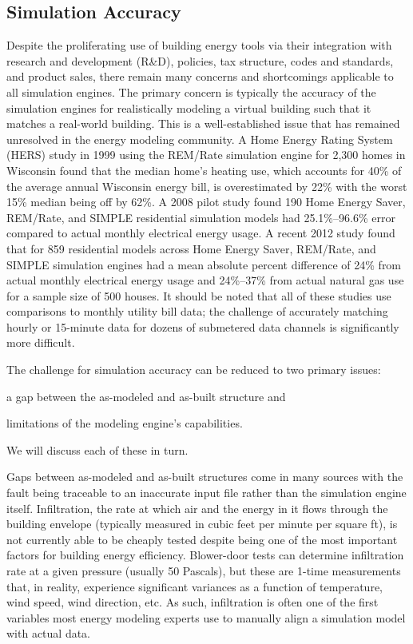 \documentclass[preprint, review, 12pt]{elsarticle}
\begin{document}
\subsection{Simulation Accuracy}
Despite the proliferating use of building energy tools via their integration with research and development (R\&D), policies, tax structure, codes and standards, and product sales, there remain many concerns and shortcomings applicable to all simulation engines. The primary concern is typically the accuracy of the simulation engines for realistically modeling a virtual building such that it matches a real-world building. This is a well-established issue that has remained unresolved in the energy modeling community. A Home Energy Rating System (HERS) study in 1999 \cite{cit:pigg2001} using the REM/Rate
simulation engine for 2,300 homes in Wisconsin found that the median home's heating use, which accounts for 40\% of the average annual Wisconsin energy bill, is overestimated by 22\% with the worst 15\% median being off by 62\%. A 2008 pilot study \cite{cit:earthadvantage2009} found 190 Home Energy Saver, REM/Rate, and SIMPLE residential simulation models had 25.1\%--96.6\% error compared to actual monthly electrical energy usage. A recent 2012 study \cite{cit:roberts2012} found that for 859 residential models across Home Energy Saver, REM/Rate, and SIMPLE simulation engines had a mean absolute percent difference of 24\% from actual monthly electrical energy usage and 24\%--37\% from actual natural gas use for a sample size of 500 houses. It should be noted that all of these studies use comparisons to monthly utility bill data; the challenge of accurately matching hourly or 15-minute data for dozens of submetered data channels is significantly more difficult.

The challenge for simulation accuracy can be reduced to two primary issues: \begin{inparaenum}[1)]
\item a gap between the as-modeled and as-built structure and 
\item limitations of the modeling engine's capabilities. 
\end{inparaenum}
We will discuss each of these in turn.

Gaps between as-modeled and as-built structures come in many sources with the fault being traceable to an inaccurate input file rather than the simulation engine itself. Infiltration, the rate at which air and the energy in it flows through the building envelope (typically measured in cubic feet per minute per square ft), is not currently able to be cheaply tested despite being one of the most important factors for building energy efficiency. Blower-door tests can determine infiltration rate at a given pressure (usually 50 Pascals), but these are 1-time measurements that, in reality, experience significant variances as a function of temperature, wind speed, wind direction, etc. As such, infiltration is often one of the first variables most energy modeling experts use to manually align a simulation model with actual data.
\end{document}
